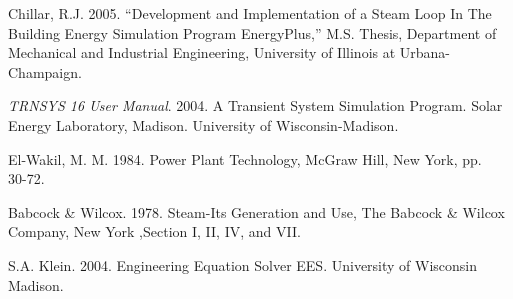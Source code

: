 Chillar, R.J. 2005. ``Development and Implementation of a Steam Loop In The Building Energy Simulation Program EnergyPlus,'' M.S. Thesis, Department of Mechanical and Industrial Engineering, University of Illinois at Urbana-Champaign.

\emph{TRNSYS 16 User Manual}. 2004. A Transient System Simulation Program. Solar Energy Laboratory, Madison. University of Wisconsin-Madison.

El-Wakil, M. M. 1984. Power Plant Technology, McGraw Hill, New York, pp.~~ 30-72.

Babcock \& Wilcox. 1978. Steam-Its Generation and Use, The Babcock \& Wilcox Company, New York ,Section I, II, IV, and VII.

S.A. Klein. 2004. Engineering Equation Solver EES. University of Wisconsin Madison.
